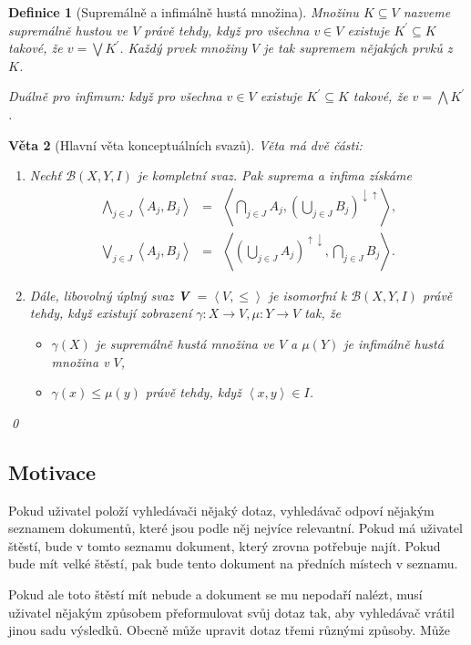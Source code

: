 \documentclass{article}
\newcommand{\addk}[1]{\left(#1\right)}
\newcommand{\addsp}[1]{\left<#1\right>}
\newcommand{\lattice}{\mathcal{B}(X, Y, I)}
\newcommand{\updown}{^{\uparrow\downarrow}}
\newcommand{\downup}{^{\downarrow\uparrow}}
\newcommand{\biginf}{\bigwedge}
\newcommand{\bigsup}{\bigvee}
\newtheorem{mydef}{Definice}
\newtheorem{theorem}[mydef]{Věta}
\begin{document}
\begin{mydef}[Supremálně a infimálně hustá množina]
Množinu $K\subseteq V$ nazveme supremálně hustou ve $V$ právě tehdy, když pro všechna $v \in V$ existuje $K^\prime\subseteq K$ takové, že $v=\bigsup K^\prime$. Každý prvek množiny $V$ je tak supremem nějakých prvků z~$K$.

Duálně pro infimum: když pro všechna $v \in V$ existuje $K^\prime\subseteq K$ takové, že $v=\biginf K^\prime$.
\end{mydef}


\begin{theorem}[Hlavní věta konceptuálních svazů]
Věta má dvě části:
\begin{enumerate}
	\item Nechť $\lattice$ je kompletní svaz. Pak suprema a infima získáme
	\begin{eqnarray}
	\biginf_{j\in J}\addsp{A_j, B_j}&=&\addsp{\bigcap_{j\in J}A_j, \addk{\bigcup_{j\in J}B_j}\downup},\label{eq.main1}\\
	\bigsup_{j\in J}\addsp{A_j, B_j}&=&\addsp{\addk{\bigcup_{j\in J}A_j}\updown,\bigcap_{j\in J}B_j}.
	\end{eqnarray}
	\item Dále, libovolný úplný svaz \textbf{V} $=\addsp{V,\le}$ je isomorfní k $\lattice$ právě tehdy, když existují zobrazení $\gamma: X\rightarrow V, \mu:Y\rightarrow V$ tak, že
	\begin{itemize}
		\item $\gamma(X)$ je supremálně hustá množina ve $V$ a $\mu(Y)$ je infimálně hustá množina v $V$,
		\item $\gamma(x)\le\mu(y)$ právě tehdy, když $\addsp{x,y}\in I$.
	\end{itemize}
\end{enumerate}
\qed\end{theorem}

\subsection{Motivace}

Pokud uživatel položí vyhledávači nějaký dotaz, vyhledávač odpoví nějakým seznamem dokumentů, které jsou podle něj nejvíce relevantní. Pokud má uživatel štěstí, bude v tomto seznamu dokument, který zrovna potřebuje najít. Pokud bude mít velké štěstí, pak bude tento dokument na předních místech v seznamu. 

Pokud ale toto štěstí mít nebude a dokument se mu nepodaří nalézt, musí uživatel nějakým způsobem přeformulovat svůj dotaz tak, aby vyhledávač vrátil jinou sadu výsledků. Obecně může upravit dotaz třemi různými způsoby. Může
\end{document}

